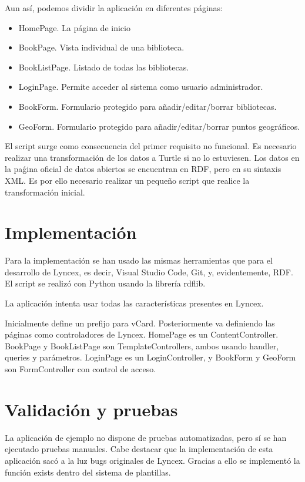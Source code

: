 \documentclass[openright,twoside,12pt]{book}
\begin{document}
Aun así, podemos dividir la aplicación en diferentes páginas:
\begin{itemize}
    \item HomePage. La página de inicio
    \item BookPage. Vista individual de una biblioteca.
    \item BookListPage. Listado de todas las bibliotecas.
    \item LoginPage. Permite acceder al sistema como usuario administrador.
    \item BookForm. Formulario protegido para añadir/editar/borrar bibliotecas.
    \item GeoForm. Formulario protegido para añadir/editar/borrar puntos geográficos.
\end{itemize}

El script surge como consecuencia del primer requisito no funcional. Es necesario realizar una transformación de los datos a Turtle si no lo estuviesen. Los datos en la paǵina oficial de datos abiertos se encuentran en RDF, pero en su sintaxis XML. Es por ello necesario realizar un pequeño script que realice la transformación inicial.


\section{Implementación}

Para la implementación se han usado las mismas herramientas que para el desarrollo de Lyncex, es decir, Visual Studio Code, Git, y, evidentemente, RDF. El script se realizó con Python usando la librería rdflib.

La aplicación intenta usar todas las características presentes en Lyncex. 

Inicialmente define un prefijo para vCard. Posteriormente va definiendo las páginas como controladores de Lyncex. HomePage es un ContentController. BookPage y BookListPage son TemplateControllers, ambos usando handler, queries y parámetros. LoginPage es un LoginController, y BookForm y GeoForm son FormController con control de acceso.

\section{Validación y pruebas} 

La aplicación de ejemplo no dispone de pruebas automatizadas, pero sí se han ejecutado pruebas manuales. Cabe destacar que la implementación de esta aplicación sacó a la luz bugs originales de Lyncex. Gracias a ello se implementó la función exists dentro del sistema de plantillas.
\end{document}
